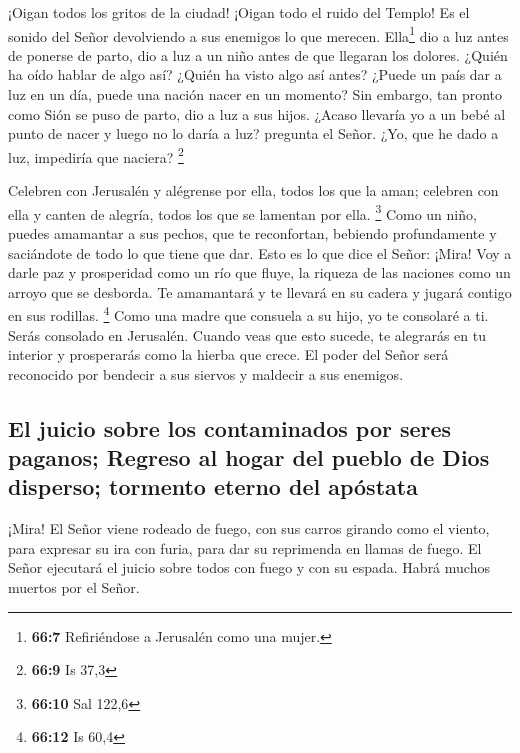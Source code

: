 ¡Oigan todos los gritos de la ciudad! ¡Oigan todo el
ruido del Templo! Es el sonido del Señor devolviendo a sus enemigos lo
que merecen.  Ella\footnote{\textbf{66:7} Refiriéndose a
  Jerusalén como una mujer.} dio a luz antes de ponerse de parto, dio a
luz a un niño antes de que llegaran los dolores.  ¿Quién
ha oído hablar de algo así? ¿Quién ha visto algo así antes? ¿Puede un
país dar a luz en un día, puede una nación nacer en un momento? Sin
embargo, tan pronto como Sión se puso de parto, dio a luz a sus hijos.
 ¿Acaso llevaría yo a un bebé al punto de nacer y luego no
lo daría a luz? pregunta el Señor. ¿Yo, que he dado a luz, impediría que
naciera? \footnote{\textbf{66:9} Is 37,3}

 Celebren con Jerusalén y alégrense por ella, todos los
que la aman; celebren con ella y canten de alegría, todos los que se
lamentan por ella. \footnote{\textbf{66:10} Sal 122,6} 
Como un niño, puedes amamantar a sus pechos, que te reconfortan,
bebiendo profundamente y saciándote de todo lo que tiene que dar.
 Esto es lo que dice el Señor: ¡Mira! Voy a darle paz y
prosperidad como un río que fluye, la riqueza de las naciones como un
arroyo que se desborda. Te amamantará y te llevará en su cadera y jugará
contigo en sus rodillas. \footnote{\textbf{66:12} Is 60,4}
 Como una madre que consuela a su hijo, yo te consolaré a
ti. Serás consolado en Jerusalén.  Cuando veas que esto
sucede, te alegrarás en tu interior y prosperarás como la hierba que
crece. El poder del Señor será reconocido por bendecir a sus siervos y
maldecir a sus enemigos.

\hypertarget{el-juicio-sobre-los-contaminados-por-seres-paganos-regreso-al-hogar-del-pueblo-de-dios-disperso-tormento-eterno-del-apuxf3stata}{%
\subsection{El juicio sobre los contaminados por seres paganos; Regreso
al hogar del pueblo de Dios disperso; tormento eterno del
apóstata}\label{el-juicio-sobre-los-contaminados-por-seres-paganos-regreso-al-hogar-del-pueblo-de-dios-disperso-tormento-eterno-del-apuxf3stata}}

 ¡Mira! El Señor viene rodeado de fuego, con sus carros
girando como el viento, para expresar su ira con furia, para dar su
reprimenda en llamas de fuego.  El Señor ejecutará el
juicio sobre todos con fuego y con su espada. Habrá muchos muertos por
el Señor.

